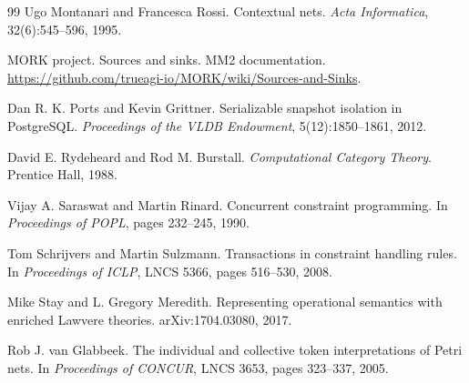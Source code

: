 \documentclass[11pt]{article}
\theoremstyle{plain}
\theoremstyle{definition}
\theoremstyle{remark}
\begin{document}
\begin{thebibliography}{99}
Ugo Montanari and Francesca Rossi.
Contextual nets.
\emph{Acta Informatica}, 32(6):545--596, 1995.

MORK project.
Sources and sinks. MM2 documentation.
\url{https://github.com/trueagi-io/MORK/wiki/Sources-and-Sinks}.

Dan R. K. Ports and Kevin Grittner.
Serializable snapshot isolation in PostgreSQL.
\emph{Proceedings of the VLDB Endowment}, 5(12):1850--1861, 2012.

David E. Rydeheard and Rod M. Burstall.
\emph{Computational Category Theory}.
Prentice Hall, 1988.

Vijay A. Saraswat and Martin Rinard.
Concurrent constraint programming.
In \emph{Proceedings of POPL}, pages 232--245, 1990.

Tom Schrijvers and Martin Sulzmann.
Transactions in constraint handling rules.
In \emph{Proceedings of ICLP}, LNCS 5366, pages 516--530, 2008.

Mike Stay and L. Gregory Meredith.
Representing operational semantics with enriched Lawvere theories.
arXiv:1704.03080, 2017.

Rob J. van Glabbeek.
The individual and collective token interpretations of Petri nets.
In \emph{Proceedings of CONCUR}, LNCS 3653, pages 323--337, 2005.

\end{thebibliography}
\end{document}

